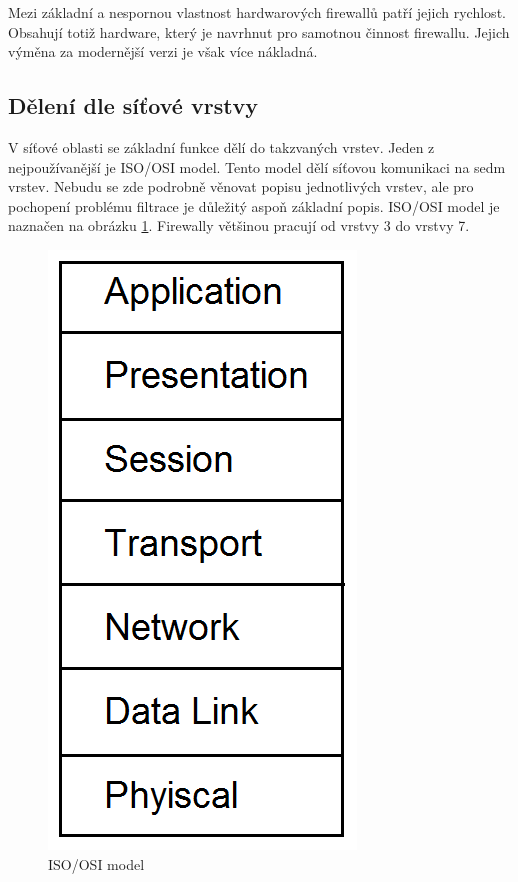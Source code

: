 \documentclass[11pt,a4paper]{article}
\begin{document}
Mezi základní a nespornou vlastnost hardwarových firewallů patří jejich rychlost. Obsahují totiž hardware, který je navrhnut pro samotnou činnost firewallu. Jejich výměna za modernější verzi je však více nákladná.

\subsection{Dělení dle síťové vrstvy}

V síťové oblasti se základní funkce dělí do takzvaných vrstev. Jeden z nejpoužívanější je ISO/OSI model. Tento model dělí síťovou komunikaci na sedm vrstev. Nebudu se zde podrobně věnovat popisu jednotlivých vrstev, ale pro pochopení problému filtrace je důležitý aspoň základní popis. ISO/OSI model je naznačen na obrázku \ref{pic:osi_model}. Firewally většinou pracují od vrstvy 3 do vrstvy 7. 

\begin{figure}[ht]
	\center
	\includegraphics[scale=0.25]{./pict/osi.png}
	\caption{ISO/OSI model \cite{ref:osi}}
	\label{pic:osi_model}
\end{figure}
\end{document}
